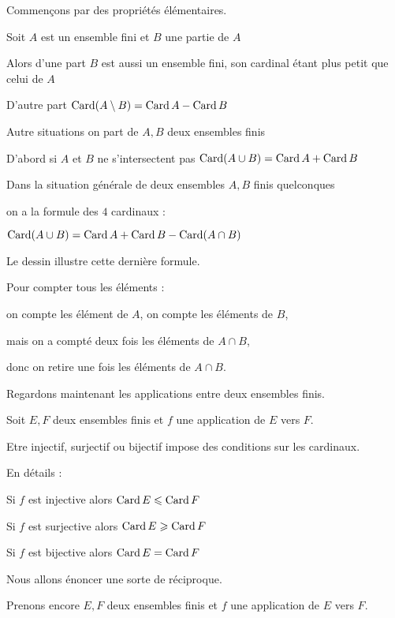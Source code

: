 Commençons par des propriétés élémentaires.


Soit $A$ est un ensemble fini et $B$ une partie de $A$


Alors d'une part $B$ est aussi un ensemble fini, son cardinal étant plus petit que celui de $A$

\change

D'autre part $\mathop{\text{Card}}\nolimits (A \setminus B) = \mathop{\text{Card}}\nolimits A - \mathop{\text{Card}}\nolimits B$

\change

Autre situations on part de $A, B$ deux ensembles finis 

D'abord si $A$ et $B$ ne s'intersectent pas $\mathop{\text{Card}}\nolimits (A \cup B) = \mathop{\text{Card}}\nolimits A + \mathop{\text{Card}}\nolimits B$

Dans la situation générale 
de deux ensembles $A,B$ finis quelconques

on a la formule des $4$ cardinaux :

$\mathop{\text{Card}}\nolimits (A \cup B) = \mathop{\text{Card}}\nolimits A + \mathop{\text{Card}}\nolimits B - \mathop{\text{Card}}\nolimits (A\cap B)$

\change

Le dessin illustre cette dernière formule.

Pour compter tous les éléments : 

on compte les élément de $A$, on compte les éléments de $B$,

mais on a compté deux fois les éléments de $A\cap B$,

donc on retire une fois les éléments de $A \cap B$.

\diapo

Regardons maintenant les applications entre deux ensembles finis.


Soit $E,F$ deux ensembles finis et $f$ une application de  $E$ vers $F$.

Etre injectif, surjectif ou bijectif impose des conditions sur les cardinaux.

En détails :

Si $f$ est injective alors $\mathop{\text{Card}}\nolimits E \leqslant \mathop{\text{Card}}\nolimits F$

\change

Si $f$ est surjective alors $\mathop{\text{Card}}\nolimits E \geqslant \mathop{\text{Card}}\nolimits F$

\change

Si $f$ est bijective alors $\mathop{\text{Card}}\nolimits E = \mathop{\text{Card}}\nolimits F$


\diapo

Nous allons énoncer une sorte de réciproque.

Prenons encore $E,F$ deux ensembles finis et $f$ une application de $E$ vers $F$.


